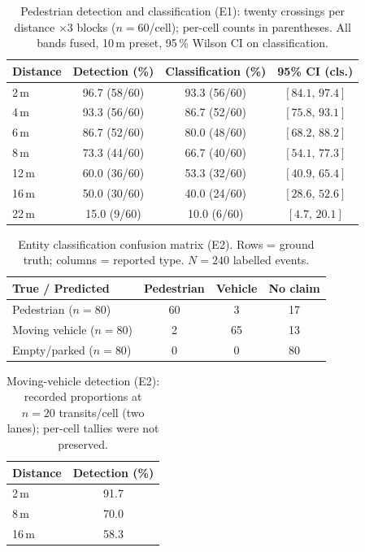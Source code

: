 \documentclass[journal,10pt]{IEEEtran}
\begin{document}
\begin{table}[htbp]
\centering
\caption{Pedestrian detection and classification (E1): twenty crossings per
distance $\times3$ blocks ($n = 60$/cell); per-cell counts in parentheses.
All bands fused, 10\,m preset, 95\,\% Wilson CI on classification.}
\label{tab:det_distance}
\footnotesize
\begin{tabular}{@{}lccc@{}}
\toprule
\textbf{Distance} & \textbf{Detection (\%)} & \textbf{Classification (\%)} &
\textbf{95\% CI (cls.)} \\
\midrule
2\,m  & 96.7 (58/60) & 93.3 (56/60) & $[84.1,\,97.4]$ \\
4\,m  & 93.3 (56/60) & 86.7 (52/60) & $[75.8,\,93.1]$ \\
6\,m  & 86.7 (52/60) & 80.0 (48/60) & $[68.2,\,88.2]$ \\
8\,m  & 73.3 (44/60) & 66.7 (40/60) & $[54.1,\,77.3]$ \\
12\,m & 60.0 (36/60) & 53.3 (32/60) & $[40.9,\,65.4]$ \\
16\,m & 50.0 (30/60) & 40.0 (24/60) & $[28.6,\,52.6]$ \\
22\,m & 15.0 (9/60)  & 10.0 (6/60)  & $[4.7,\,20.1]$ \\
\bottomrule
\end{tabular}
\end{table}

\begin{table}[htbp]
\centering
\caption{Entity classification confusion matrix (E2). Rows = ground truth; columns =
reported type. $N = 240$ labelled events.}
\label{tab:confusion}
\footnotesize
\begin{tabular}{@{}lccc@{}}
\toprule
\textbf{True / Predicted} & \textbf{Pedestrian} & \textbf{Vehicle} &
\textbf{No claim} \\
\midrule
Pedestrian  ($n = 80$)  & 60 & 3 & 17 \\
Moving vehicle ($n = 80$) & 2 & 65 & 13 \\
Empty/parked ($n = 80$) & 0 & 0 & 80 \\
\bottomrule
\end{tabular}
\end{table}

\begin{table}[htbp]
\centering
\caption{Moving-vehicle detection (E2): recorded proportions at $n = 20$
transits/cell (two lanes); per-cell tallies were not preserved.}
\label{tab:vehicle_det}
\footnotesize
\begin{tabular}{@{}lc@{}}
\toprule
\textbf{Distance} & \textbf{Detection (\%)} \\
\midrule
2\,m  & 91.7 \\
8\,m  & 70.0 \\
16\,m & 58.3 \\
\bottomrule
\end{tabular}
\end{table}
\end{document}
